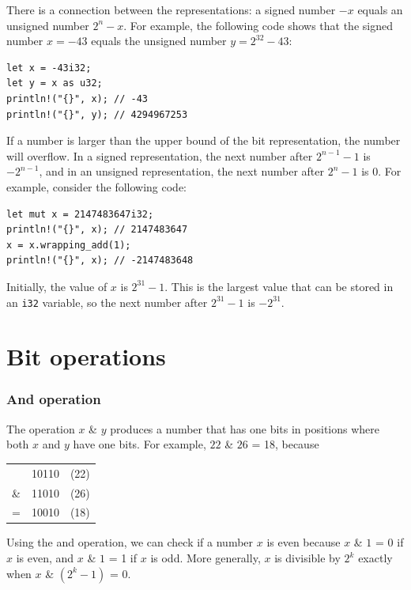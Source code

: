 There is a connection between the
representations:
a signed number $-x$ equals an unsigned number $2^n-x$.
For example, the following code shows that
the signed number $x=-43$ equals the unsigned
number $y=2^{32}-43$:
\begin{lstlisting}
let x = -43i32;
let y = x as u32;
println!("{}", x); // -43
println!("{}", y); // 4294967253
\end{lstlisting}

If a number is larger than the upper bound
of the bit representation, the number will overflow.
In a signed representation,
the next number after $2^{n-1}-1$ is $-2^{n-1}$,
and in an unsigned representation,
the next number after $2^n-1$ is $0$.
For example, consider the following code:
\begin{lstlisting}
let mut x = 2147483647i32;
println!("{}", x); // 2147483647
x = x.wrapping_add(1);
println!("{}", x); // -2147483648
\end{lstlisting}

Initially, the value of $x$ is $2^{31}-1$.
This is the largest value that can be stored
in an \texttt{i32} variable,
so the next number after $2^{31}-1$ is $-2^{31}$.


\section{Bit operations}

\newcommand\XOR{\mathbin{\char`\^}}

\subsubsection{And operation}


The  operation $x$ \& $y$ produces a number
that has one bits in positions where both
$x$ and $y$ have one bits.
For example, $22$ \& $26$ = 18, because

\begin{center}
\begin{tabular}{rrr}
& 10110 & (22)\\
\& & 11010 & (26) \\
\hline
 = & 10010 & (18) \\
\end{tabular}
\end{center}

Using the and operation, we can check if a number
$x$ is even because
$x$ \& $1$ = 0 if $x$ is even, and
$x$ \& $1$ = 1 if $x$ is odd.
More generally, $x$ is divisible by $2^k$
exactly when $x$ \& $(2^k-1)$ = 0.

